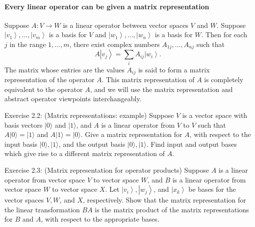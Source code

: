 \documentclass[
	11pt, %
	fleqn, %
	a4paper, %
]{LegrandOrangeBook}
\begin{document}
\paragraph{Every linear operator can be given a matrix representation}
Suppose $A: V \rightarrow W$ is a linear operator between vector spaces $V$ and $W$. Suppose $\left|v_{1}\right\rangle, \ldots,\left|v_{m}\right\rangle$ is a basis for $V$ and $\left|w_{1}\right\rangle, \ldots,\left|w_{n}\right\rangle$ is a basis for $W$. Then for each $j$ in the range $1, \ldots, m$, there exist complex numbers $A_{1 j}, \dots, A_{n j}$ such that
$$
A\left|v_{j}\right\rangle=\sum_{i} A_{i j}\left|w_{i}\right\rangle.
$$
The matrix whose entries are the values $A_{i j}$ is said to form a matrix representation of the operator $A$. This matrix representation of $A$ is completely equivalent to the operator $A$, and we will use the matrix representation and abstract operator viewpoints interchangeably. 



\begin{exercise}
Exercise 2.2: (Matrix representations: example) Suppose $V$ is a vector space with basis vectors $|0\rangle$ and $|1\rangle$, and $A$ is a linear operator from $V$ to $V$ such that $A|0\rangle=|1\rangle$ and $A|1\rangle=|0\rangle$. Give a matrix representation for $A$, with respect to the input basis $|0\rangle,|1\rangle$, and the output basis $|0\rangle,|1\rangle$. Find input and output bases which give rise to a different matrix representation of $A$.
\end{exercise}

\begin{exercise}
Exercise 2.3: (Matrix representation for operator products) Suppose $A$ is a linear operator from vector space $V$ to vector space $W$, and $B$ is a linear operator from vector space $W$ to vector space $X$. Let $\left|v_{i}\right\rangle,\left|w_{j}\right\rangle$, and $\left|x_{k}\right\rangle$ be bases for the vector spaces $V, W$, and $X$, respectively. Show that the matrix representation for the linear transformation $B A$ is the matrix product of the matrix representations for $B$ and $A$, with respect to the appropriate bases.
\end{exercise}
\end{document}
